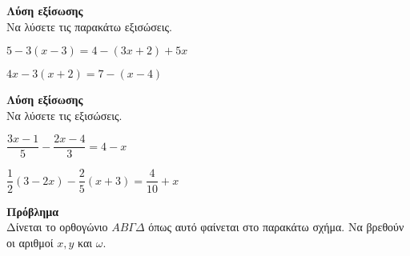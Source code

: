 \documentclass[ektypwsh]{diag-xelatex}
\begin{document}
\newpage
\noindent
\askhseis
\begin{thema}
\item \textbf{Λύση εξίσωσης}\\
Να λύσετε τις παρακάτω εξισώσεις.
\begin{rlist}
\item $ 5-3(x-3)=4-(3x+2)+5x $
\item $ 4x-3(x+2)=7-(x-4) $
\end{rlist}
\item \textbf{Λύση εξίσωσης}\\
Να λύσετε τις εξισώσεις.
\begin{rlist}
\item $ \dfrac{3x-1}{5}-\dfrac{2x-4}{3}=4-x $
\item $ \dfrac{1}{2}(3-2x)-\dfrac{2}{5}(x+3)=\dfrac{4}{10}+x $
\end{rlist}
\item \textbf{Πρόβλημα}\\
Δίνεται το ορθογώνιο $ AB\varGamma\varDelta $ όπως αυτό φαίνεται στο παρακάτω σχήμα. Να βρεθούν οι αριθμοί $ x,y $ και $ \omega $.
\begin{center}
\end{center}
\end{thema}
\end{document}
